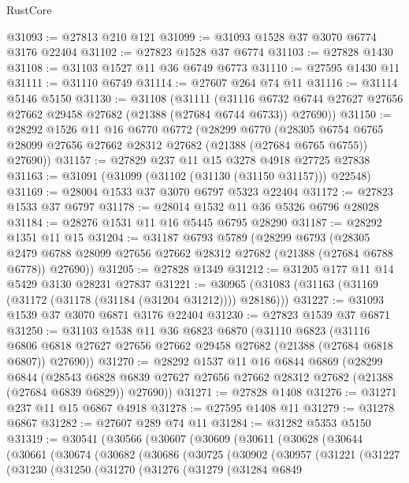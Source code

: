 \begin{lexlean}{RustCore}
\begin{coremodule}
@31093 := @27813 @210 @121
@31099 := @31093 @1528 @37 @3070 @6774 @3176 @22404
@31102 := @27823 @1528 @37 @6774
@31103 := @27828 @1430
@31108 := @31103 @1527 @11 @36 @6749 @6773
@31110 := @27595 @1430 @11
@31111 := @31110 @6749
@31114 := @27607 @264 @74 @11
@31116 := @31114 @5146 @5150
@31130 := @31108
    (@31111
      (@31116 @6732 @6744 @27627 @27656 @27662 @29458 @27682 (@21388 (@27684 @6744 @6733)) @27690))
@31150 := @28292
    @1526
    @11
    @16
    @6770
    @6772
    (@28299
      @6770
      (@28305 @6754 @6765 @28099 @27656 @27662 @28312 @27682 (@21388 (@27684 @6765 @6755)) @27690))
@31157 := @27829 @237 @11 @15 @3278 @4918 @27725 @27838
@31163 := @31091 (@31099 (@31102 (@31130 (@31150 @31157))) @22548)
@31169 := @28004 @1533 @37 @3070 @6797 @5323 @22404
@31172 := @27823 @1533 @37 @6797
@31178 := @28014 @1532 @11 @36 @5326 @6796 @28028
@31184 := @28276 @1531 @11 @16 @5445 @6795 @28290
@31187 := @28292 @1351 @11 @15
@31204 := @31187
    @6793
    @5789
    (@28299
      @6793
      (@28305 @2479 @6788 @28099 @27656 @27662 @28312 @27682 (@21388 (@27684 @6788 @6778)) @27690))
@31205 := @27828 @1349
@31212 := @31205 @177 @11 @14 @5429 @3130 @28231 @27837
@31221 := @30965 (@31083 (@31163 (@31169 (@31172 (@31178 (@31184 (@31204 @31212)))) @28186)))
@31227 := @31093 @1539 @37 @3070 @6871 @3176 @22404
@31230 := @27823 @1539 @37 @6871
@31250 := @31103
    @1538
    @11
    @36
    @6823
    @6870
    (@31110
      @6823
      (@31116 @6806 @6818 @27627 @27656 @27662 @29458 @27682 (@21388 (@27684 @6818 @6807)) @27690))
@31270 := @28292
    @1537
    @11
    @16
    @6844
    @6869
    (@28299
      @6844
      (@28543 @6828 @6839 @27627 @27656 @27662 @28312 @27682 (@21388 (@27684 @6839 @6829)) @27690))
@31271 := @27828 @1408
@31276 := @31271 @237 @11 @15 @6867 @4918
@31278 := @27595 @1408 @11
@31279 := @31278 @6867
@31282 := @27607 @289 @74 @11
@31284 := @31282 @5353 @5150
@31319 := @30541
    (@30566
      (@30607
        (@30609
          (@30611
            (@30628
              (@30644
                (@30661
                  (@30674
                    (@30682
                      (@30686
                        (@30725
                          (@30902
                            (@30957
                              (@31221
                                (@31227
                                  (@31230
                                    (@31250
                                      (@31270
                                        (@31276
                                          (@31279
                                            (@31284
                                              @6849

\end{coremodule}
\end{lexlean}
